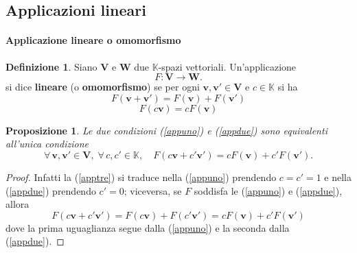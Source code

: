 \documentclass{article}
\theoremstyle{plain}
\newtheorem{prop}[thm]{Proposizione}
\theoremstyle{definition}
\newtheorem{defn}{Definizione}[section]
\theoremstyle{remark}
\begin{document}
\subsection{Applicazioni lineari}
\vspace{20pt}


\paragraph{Applicazione lineare o omomorfismo}
\begin{bxthm}
\begin{defn}
    Siano $\mathbf{V}$ e $\mathbf{W}$ due $\mathbb{K}$-spazi vettoriali. 
    Un'applicazione \[F:\mathbf{V}\to \mathbf{W}.\]
    si dice \textbf{lineare} (o \textbf{omomorfismo}) se per ogni $\mathbf{v},\mathbf{v}'\in \mathbf{V}$ e $c\in \mathbb{K}$ si ha
    \begin{equation}\label{appuno}
        F(\mathbf{v}+\mathbf{v}')=F(\mathbf{v})+F(\mathbf{v}')
    \end{equation}
    \begin{equation}\label{appdue}
        F(c\mathbf{v})=cF(\mathbf{v}) 
    \end{equation}
\end{defn}
\end{bxthm}

\vspace{10pt}

\begin{bxthm}
\begin{prop}
    Le due condizioni (\ref{appuno}) e (\ref{appdue}) sono equivalenti all'unica condizione
    \begin{equation}\label{apptre}
        \forall\,\mathbf{v},\mathbf{v}'\in \mathbf{V},\;\forall\,c,c'\in \mathbb{K},\quad F(c\mathbf{v}+c'\mathbf{v}')=cF(\mathbf{v})+c'F(\mathbf{v}'). 
    \end{equation}
\end{prop}
\end{bxthm}
\begin{proof}
    Infatti la (\ref{apptre}) si traduce nella (\ref{appuno}) prendendo $c=c'=1$ e nella (\ref{appdue}) prendendo $c'=0$; viceversa, se $F$ soddisfa le (\ref{appuno}) e (\ref{appdue}), allora
    \[F(c\mathbf{v}+c'\mathbf{v}')=F(c\mathbf{v})+F(c'\mathbf{v}')=cF(\mathbf{v})+c'F(\mathbf{v}') \]
    dove la prima uguaglianza segue dalla (\ref{appuno}) e la seconda dalla (\ref{appdue}).
\end{proof}

\vspace{10pt}
    
\end{document}
